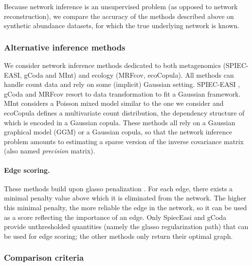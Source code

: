 Because network inference is an unsupervised problem (as opposed to network reconstruction), we compare the accuracy of the methods described above on synthetic abundance datasets, for which the true underlying network is known.

\subsubsection{Alternative inference methods} \label{altmethods}
 
We consider network inference methods dedicated to both 
metagenomics (SPIEC-EASI, gCoda and MInt) and ecology (MRFcov, ecoCopula). All methods can handle count data and rely on some (implicit) Gaussian setting. SPIEC-EASI \citep{kurtz}, gCoda \citep{gcoda} and MRFcov \citep{CWL18} resort to data transformation to fit a Gaussian framework. MInt \citep{MInt} considers a Poisson mixed model similar to the one  we consider and ecoCopula \citep{PWT19} defines a multivariate count distribution, the dependency structure of which is encoded in a Gaussian copula. These methods all rely on a Gaussian graphical model (GGM) or a Gaussian copula, so that the network inference problem amounts to estimating a sparse version of the inverse covariance matrix (also named {\sl precision} matrix). 
 

\paragraph{Edge scoring.}
 These methods build upon glasso penalization \citep{FHT08}. For each edge, there exists a minimal penalty value above which it is eliminated from the network. The higher this minimal penalty, the more reliable the edge in the network, so it can be used as a score reflecting the importance of an edge. Only SpiecEasi and gCoda provide unthresholded quantities (namely the glasso regularization path) that can be used for edge scoring; the other methods only return their optimal graph.

\subsubsection{Comparison criteria}
 
